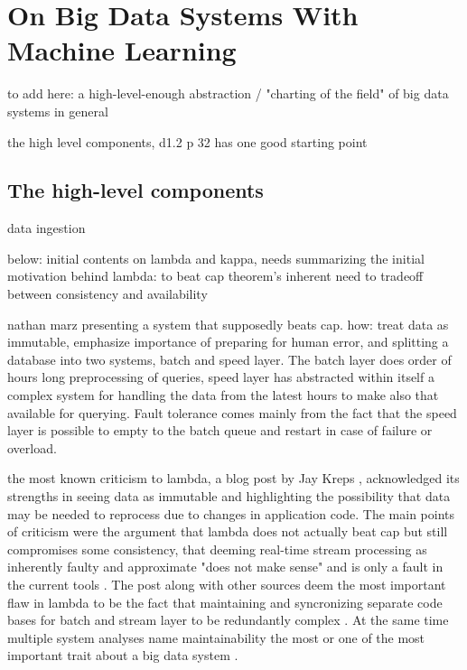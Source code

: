 \section{On Big Data Systems With Machine Learning}

to add here: a high-level-enough abstraction / "charting of the field" of big data systems in general

the high level components, d1.2 p 32 has one good starting point

\subsection{The high-level components}


data ingestion

below: initial contents on lambda and kappa, needs summarizing
the initial motivation behind lambda: to beat cap theorem's inherent need to tradeoff between consistency and availability \cite{lambdakappa}

nathan marz presenting a system that supposedly beats cap. how: treat data as immutable, emphasize importance of preparing for human error, and splitting a database into two systems, batch and speed layer. The batch layer does order of hours long preprocessing of queries, speed layer has  abstracted within itself a complex system for handling the data from the latest hours to make also that available for querying. Fault tolerance comes mainly from the fact that the speed layer is possible to empty to the batch queue and restart in case of failure or overload.

the most known criticism to lambda, a blog post by Jay Kreps \cite{questioninglambda}, acknowledged its strengths in seeing data as immutable and highlighting the possibility that data may be needed to reprocess due to changes in application code. The main points of criticism were the argument that lambda does not actually beat cap but still compromises some consistency, that deeming real-time stream processing as inherently faulty and approximate "does not make sense" and is only a fault in the current tools \cite{questioninglambda}. The post along with other sources deem the most important flaw in lambda to be the fact that maintaining and syncronizing separate code bases for batch and stream layer to be redundantly complex \cite{uber} \cite{facebook}. At the same time multiple system analyses name maintainability the most or one of the most important trait about a big data system \cite{facebook} \cite{storm@twitter}.


